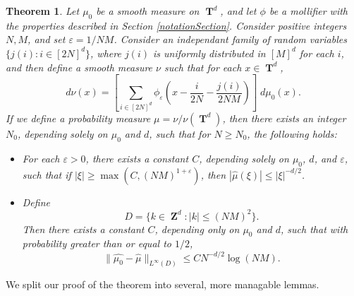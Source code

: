 \documentclass[12pt,reqno]{article}
\DeclareMathOperator{\ZZ}{\mathbf{Z}}
\DeclareMathOperator{\TT}{\mathbf{T}}
\newtheorem{theorem}{Theorem}
\begin{document}
\begin{theorem} \label{randomFourierTheorem}
    Let $\mu_0$ be a smooth measure on $\TT^d$, and let $\phi$ be a mollifier with the properties described in Section \ref{notationSection}. Consider positive integers $N, M$, and set $\varepsilon = 1/NM$. Consider an independant family of random variables $\{ j(i) : i \in [2N]^d \}$, where $j(i)$ is uniformly distributed in $[M]^d$ for each $i$, and then define a smooth measure $\nu$ such that for each $x \in \TT^d$,
    \[ d\nu(x) = \left[ \sum_{i \in [2N]^d} \phi_\varepsilon \left( x - \frac{i}{2N} - \frac{j(i)}{2NM} \right) \right]\; d\mu_0(x). \]
    If we define a probability measure $\mu = \nu / \nu(\TT^d)$, then there exists an integer $N_0$, depending solely on $\mu_0$ and $d$, such that for $N \geq N_0$, the following holds:
    \begin{itemize}
        \item[(A)] For each $\varepsilon > 0$, there exists a constant $C$, depending solely on $\mu_0$, $d$, and $\varepsilon$, such that if $|\xi| \geq \max(C, (NM)^{1+\varepsilon})$, then $|\widehat{\mu}(\xi)| \leq |\xi|^{-d/2}$.

        \item[(B)] Define
        \[ D = \{ k \in \ZZ^d : |k| \leq (NM)^2 \}. \]
        Then there exists a constant $C$, depending only on $\mu_0$ and $d$, such that with probability greater than or equal to $1/2$,
        \[ \| \widehat{\mu_0} - \widehat{\mu} \|_{L^\infty(D)} \leq C N^{-d/2} \log(NM). \]
    \end{itemize}
\end{theorem}

We split our proof of the theorem into several, more managable lemmas.
\end{document}
